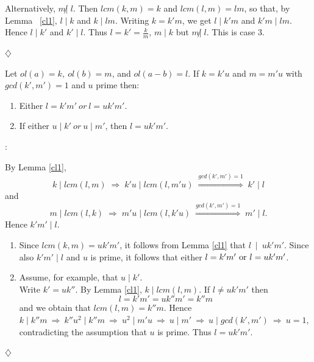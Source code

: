 {\begin{pr}
{ Alternatively, $ m \not| \; l $. Then $ lcm(k,m)=k$ and $ lcm(l,m)=lm$, so that, by Lemma~
	\ref{cl1}, $ l \mid k$ and $ k \mid lm$.
	Writing $ k=k'm$, we get
	$ l \mid k'm$ and $ k'm \mid lm$. Hence
	$ l \mid k'$ and $ k' \mid l$. Thus $ l=k'=\frac{k}{m}$,
	$ m \mid k$ but $m \not| \; l$. This is case 3. 
	    
		     }
	\begin{flushright}
		$\diamondsuit$
	\end{flushright}
\end{pr}


\begin{lem}\label{cl6} %
Let $ ol(a)=k, \ ol(b)=m $, and $ol(a-b)=l $. If $ k=k'u $ and $ m=m'u$ with  
$gcd(k',m')=1$ and $u$ prime
then:
	\begin{enumerate}
	  \item Either $ l=k'm' \  or \  l=uk'm' $.
	  \item If either $ u \mid k' \  or \ u \mid m' $, then $ l=uk'm' $.  
	\end{enumerate}
\end{lem}
\begin{pr}: \\ {\rm 
By Lemma \ref{cl1}, 
     $$ k \mid lcm(l,m) \; {\Rightarrow} \; k'u \mid lcm(l,m'u) \; \stackrel{gcd(k', m')=1}{\Longrightarrow} \; k' \mid l $$
     and
     $$ {m \mid lcm(l,k)} \; \Rightarrow \; {m'u \mid lcm(l,k'u) } \; \stackrel{gcd(k', m')=1}{\Longrightarrow} \; {m' \mid l} .$$
     Hence $ k'm' \mid l $.
\begin {enumerate}
   \item 
	 Since $ lcm(k,m)=uk'm' $, it follows from Lemma \ref{cl1} that 
	 $ l~\mid~uk'm' $. \- Since also $k'm' \mid l$ and $u$ is prime, it follows that 
	 either $ l=k'm'\  {\rm or} \ l=uk'm'$.
   \item Assume, for example, that $ u \mid k'$.\\  
     Write $ k'=uk''$. By Lemma \ref{cl1}, $ {k \mid lcm(l,m)} $. If $l \neq uk'm'$  
     then 
		$$ l=k'm'=uk''m'=k''m $$ 
     and we obtain that $lcm(l,m)=k''m $. Hence 
     $ {k \mid k''m} \ \Rightarrow \ {k''u^{2} \mid k''m} \ \Rightarrow \
      {u^{2} \mid m'u} \ \Rightarrow \ {u \mid m'} \ \Rightarrow \ 
      {u \mid gcd(k',m') } \ \Rightarrow \ {u=1,}$  
     contradicting the assumption that $u$ is prime. Thus $ l=uk'm' $.
\end{enumerate}
		      }
	\begin{flushright}
		$\diamondsuit$
	\end{flushright}
\end{pr}


}
